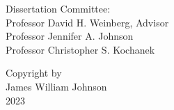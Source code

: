 \begin{titlepage}
\begin{center}
\begin{doublespace}
%
%
\vspace*{2.5cm}
Dissertation Committee:\\
%
%
%
Professor David H. Weinberg, Advisor
\\
Professor Jennifer A. Johnson
\\
Professor Christopher S. Kochanek


%
%
%
\newpage

\thispagestyle{empty} %

\vspace*{5.0cm}
Copyright by
\\
James William Johnson
\\
2023
\end{doublespace}
\end{center}

%
%
\end{titlepage}

